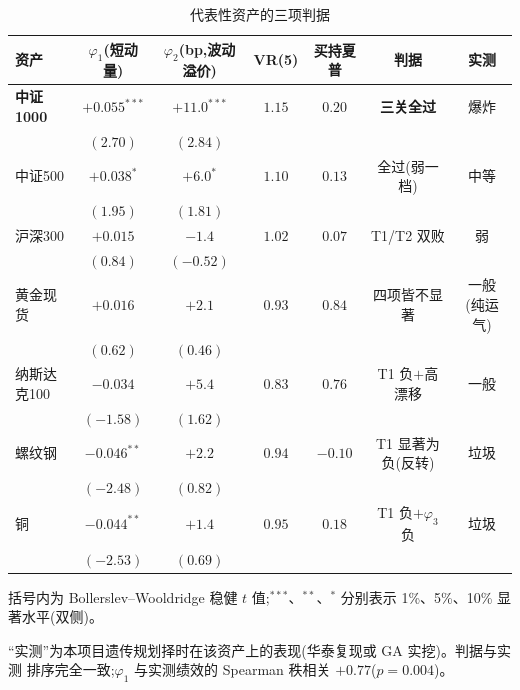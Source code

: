 \documentclass[11pt,a4paper,fontset=mac]{ctexart}
\begin{document}
\begin{table}[htbp]\centering
\caption{代表性资产的三项判据}\label{tab:cross}
\footnotesize\setlength{\tabcolsep}{4.5pt}\begin{threeparttable}
\begin{tabular}{lcccccc}
\toprule
资产 & $\varphi_1$(短动量) & $\varphi_2$(bp,波动溢价) & VR(5) & 买持夏普 & 判据 & 实测 \\
\midrule
\textbf{中证1000} & $+0.055^{***}$ & $+11.0^{***}$ & $1.15$ & $0.20$ & \textbf{三关全过} & 爆炸 \\
                 & $(2.70)$        & $(2.84)$       &        &        &                  & \\[1pt]
中证500          & $+0.038^{*}$    & $+6.0^{*}$     & $1.10$ & $0.13$ & 全过(弱一档)   & 中等 \\
                 & $(1.95)$        & $(1.81)$       &        &        &                  & \\[1pt]
沪深300          & $+0.015$        & $-1.4$         & $1.02$ & $0.07$ & T1/T2 双败      & 弱 \\
                 & $(0.84)$        & $(-0.52)$      &        &        &                  & \\[1pt]
黄金现货          & $+0.016$        & $+2.1$         & $0.93$ & $0.84$ & 四项皆不显著      & 一般(纯运气) \\
                 & $(0.62)$        & $(0.46)$       &        &        &                  & \\[1pt]
纳斯达克100       & $-0.034$        & $+5.4$         & $0.83$ & $0.76$ & T1 负$+$高漂移   & 一般 \\
                 & $(-1.58)$       & $(1.62)$       &        &        &                  & \\[1pt]
螺纹钢            & $-0.046^{**}$   & $+2.2$         & $0.94$ & $-0.10$& T1 显著为负(反转)& 垃圾 \\
                 & $(-2.48)$       & $(0.82)$       &        &        &                  & \\[1pt]
铜               & $-0.044^{**}$   & $+1.4$         & $0.95$ & $0.18$ & T1 负$+\varphi_3$ 负 & 垃圾 \\
                 & $(-2.53)$       & $(0.69)$       &        &        &                  & \\
\bottomrule
\end{tabular}
\begin{tablenotes}\scriptsize
\item 括号内为 Bollerslev--Wooldridge 稳健 $t$ 值;$^{***}$、$^{**}$、$^{*}$ 分别表示
1\%、5\%、10\% 显著水平(双侧)。
\item ``实测''为本项目遗传规划择时在该资产上的表现(华泰复现或 GA 实挖)。判据与实测
排序完全一致;$\varphi_1$ 与实测绩效的 Spearman 秩相关 $+0.77$($p=0.004$)。
\end{tablenotes}\end{threeparttable}
\end{table}
\end{document}
